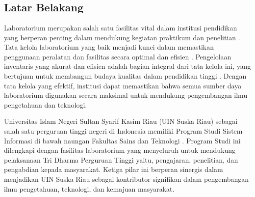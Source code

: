 %
%
%
%

\chapter{\babSatu}

\section{Latar Belakang}
Laboratorium merupakan salah satu fasilitas vital dalam institusi pendidikan yang berperan penting dalam mendukung kegiatan praktikum dan penelitian \cite{la2021comparison}. Tata kelola laboratorium yang baik menjadi kunci dalam memastikan penggunaan peralatan dan fasilitas secara optimal dan efisien \cite{abrantes2020governance}. Pengelolaan inventaris yang akurat dan efisien adalah bagian integral dari tata kelola ini, yang bertujuan untuk membangun budaya kualitas dalam pendidikan tinggi \cite{abrantes2020governance}. Dengan tata kelola yang efektif, institusi dapat memastikan bahwa semua sumber daya laboratorium digunakan secara maksimal untuk mendukung pengembangan ilmu pengetahuan dan teknologi.

Universitas Islam Negeri Sultan Syarif Kasim Riau (UIN Suska Riau) sebagai salah satu perguruan tinggi negeri di Indonesia memiliki Program Studi Sistem Informasi di bawah naungan Fakultas Sains dan Teknologi \cite{uin-suska-website}. Program Studi ini dilengkapi dengan fasilitas laboratorium yang menyeluruh untuk mendukung pelaksanaan Tri Dharma Perguruan Tinggi yaitu, pengajaran, penelitian, dan pengabdian kepada masyarakat. Ketiga pilar ini berperan sinergis dalam menjadikan UIN Suska Riau sebagai kontributor signifikan dalam pengembangan ilmu pengetahuan, teknologi, dan kemajuan masyarakat.

